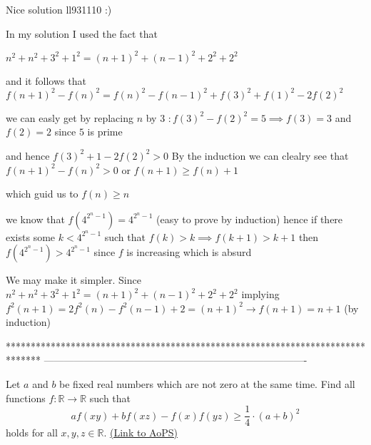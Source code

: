 \begin{solution}
	\begin{tcolorbox}Nice solution ll931110   :) 

In my solution I used the fact that 

$ n^2 + n^2 + 3^2 + 1^2 = (n + 1)^2 + (n - 1)^2 + 2^2 + 2^2$

and it follows that $ f(n + 1)^2 - f(n)^2 = f(n)^2 - f(n - 1)^2 + f(3)^2 + f(1)^2 - 2f(2)^2$

we can easly get by replacing $ n$ by $ 3$ $ : f(3)^2 - f(2)^2 = 5 \implies f(3) = 3$ and $ f(2) = 2$ since $ 5$ is prime 

and hence $ f(3)^2 + 1 - 2f(2)^2 > 0$ By the induction we can clealry see that $ f(n + 1)^2 - f(n)^2 > 0$ or $ f(n + 1)\ge f(n) + 1$

which guid us to $ f(n) \ge n$

we know that $ f(4^{2^n - 1}) = 4^{2^n - 1}$ (easy to prove by induction) hence if there exists some $ k < 4^{2^n - 1}$ such that $ f(k) > k \implies f(k + 1) > k + 1$ then $ f(4^{2^n - 1}) > 4^{2^n - 1}$ since $ f$ is increasing which is absurd \end{tcolorbox}

We may make it simpler. Since $ n^2 + n^2 + 3^2 + 1^2 = (n + 1)^2 + (n - 1)^2 + 2^2 + 2^2$ implying $ f^2(n + 1) = 2f^2(n) - f^2(n - 1) + 2 = (n + 1)^2 \rightarrow f(n + 1) = n + 1$ (by induction)
\end{solution}
*******************************************************************************
-------------------------------------------------------------------------------

\begin{problem}
	Let $ a$ and $b$ be fixed real numbers which are not zero at the same time. Find all functions $ f: \mathbb R\to \mathbb R$ such that
\[ af(xy)+bf(xz)-f(x)f(yz)\geq \frac{1}{4}\cdot(a+b)^2\]
holds for all $ x,y,z\in \mathbb R$.
	\flushright \href{https://artofproblemsolving.com/community/c6h314746}{(Link to AoPS)}
\end{problem}



